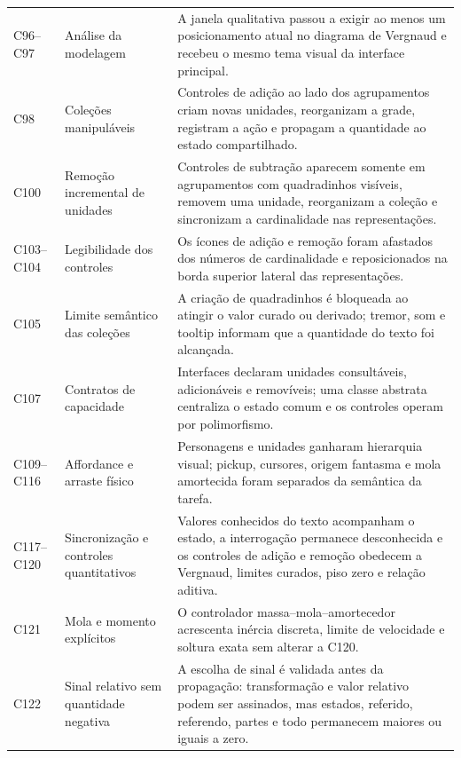 \documentclass[preprint,12pt,authoryear]{elsarticle}
\begin{document}
\begin{longtable}{@{}>{\raggedright\arraybackslash}p{2.55cm}>{\raggedright\arraybackslash}p{3.1cm}>{\raggedright\arraybackslash}p{8.35cm}@{}}
C96--C97 & Análise da modelagem & A janela qualitativa passou a exigir ao menos um posicionamento atual no diagrama de Vergnaud e recebeu o mesmo tema visual da interface principal.\\
C98 & Coleções manipuláveis & Controles de adição ao lado dos agrupamentos criam novas unidades, reorganizam a grade, registram a ação e propagam a quantidade ao estado compartilhado.\\
C100 & Remoção incremental de unidades & Controles de subtração aparecem somente em agrupamentos com quadradinhos visíveis, removem uma unidade, reorganizam a coleção e sincronizam a cardinalidade nas representações.\\
C103--C104 & Legibilidade dos controles & Os ícones de adição e remoção foram afastados dos números de cardinalidade e reposicionados na borda superior lateral das representações.\\
C105 & Limite semântico das coleções & A criação de quadradinhos é bloqueada ao atingir o valor curado ou derivado; tremor, som e tooltip informam que a quantidade do texto foi alcançada.\\
C107 & Contratos de capacidade & Interfaces declaram unidades consultáveis, adicionáveis e removíveis; uma classe abstrata centraliza o estado comum e os controles operam por polimorfismo.\\
C109--C116 & Affordance e arraste físico & Personagens e unidades ganharam hierarquia visual; pickup, cursores, origem fantasma e mola amortecida foram separados da semântica da tarefa.\\
C117--C120 & Sincronização e controles quantitativos & Valores conhecidos do texto acompanham o estado, a interrogação permanece desconhecida e os controles de adição e remoção obedecem a Vergnaud, limites curados, piso zero e relação aditiva.\\
C121 & Mola e momento explícitos & O controlador massa--mola--amortecedor acrescenta inércia discreta, limite de velocidade e soltura exata sem alterar a C120.\\
C122 & Sinal relativo sem quantidade negativa & A escolha de sinal é validada antes da propagação: transformação e valor relativo podem ser assinados, mas estados, referido, referendo, partes e todo permanecem maiores ou iguais a zero.\\
\end{longtable}
\endgroup
\end{document}

